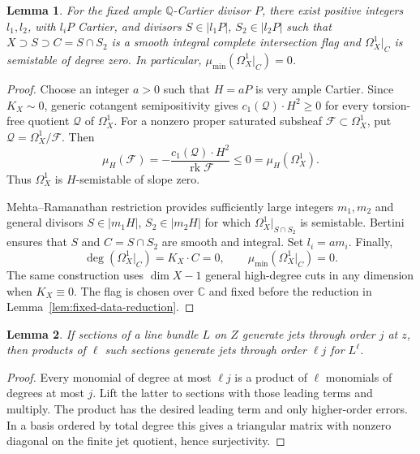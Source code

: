 \documentclass[12pt,a4paper,psamsfonts]{amsart}
\theoremstyle{definition}
\theoremstyle{plain}
\newtheorem{lemma}{Lemma}[section]
\newcommand{\C}{\mathbb C}
\begin{document}
\begin{lemma}\label{lem:cotangent-flag}
For the fixed ample $\mathbb{Q}$-Cartier divisor $P$, there exist
positive integers $l_1,l_2$, with $l_iP$ Cartier, and divisors
$S\in|l_1P|$, $S_2\in|l_2P|$ such that
$X\supset S\supset C=S\cap S_2$ is a smooth integral complete
intersection flag and $\Omega_X^1|_C$ is semistable of degree zero.
In particular, $\mu_{\min}(\Omega_X^1|_C)=0$.
\end{lemma}
\begin{proof}
Choose an integer $a>0$ such that $H=aP$ is very ample Cartier.
Since $K_X\sim0$, generic cotangent semipositivity
\cite[Theorem~2.1]{CP} gives
$c_1(\mathcal Q)\cdot H^2\ge0$ for every torsion-free quotient
$\mathcal Q$ of $\Omega_X^1$. For a nonzero proper saturated
subsheaf $\mathcal F\subset\Omega_X^1$, put
$\mathcal Q=\Omega_X^1/\mathcal F$. Then
\[
 \mu_H(\mathcal F)
 =-\frac{c_1(\mathcal Q)\cdot H^2}{\operatorname{rk}\mathcal F}
 \le0=\mu_H(\Omega_X^1).
\]
Thus $\Omega_X^1$ is $H$-semistable of slope zero.

Mehta--Ramanathan restriction \cite[Theorem~6.1]{MR} provides
sufficiently large integers $m_1,m_2$ and general divisors
$S\in|m_1H|$, $S_2\in|m_2H|$ for which
$\Omega_X^1|_{S\cap S_2}$ is semistable. Bertini ensures that
$S$ and $C=S\cap S_2$ are smooth and integral. Set $l_i=am_i$.
Finally,
\[
 \deg(\Omega_X^1|_C)=K_X\cdot C=0,
 \qquad\mu_{\min}(\Omega_X^1|_C)=0.
\]
The same construction uses $\dim X-1$ general high-degree cuts
in any dimension when $K_X\equiv0$. The flag is chosen over $\C$
and fixed before the reduction in Lemma~\ref{lem:fixed-data-reduction}.
\end{proof}

\begin{lemma}\label{lem:jet-products-hd}
If sections of a line bundle $L$ on $Z$ generate jets through
order $j$ at $z$, then products of $\ell $ such sections generate jets
through order $\ell j$ for $L^\ell $.
\end{lemma}
\begin{proof}
Every monomial of degree at most $\ell j$ is a product of $\ell $ monomials
of degrees at most $j$. Lift the latter to sections with those leading
terms and multiply. The product has the desired leading term and
only higher-order errors. In a basis ordered by total degree this
gives a triangular matrix with nonzero diagonal on the finite jet
quotient, hence surjectivity.
\end{proof}
\end{document}
